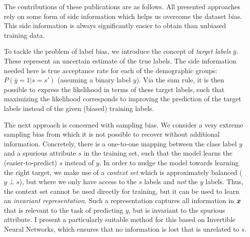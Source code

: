 The contributions of these publications are as follows.
All presented approaches rely on some form of side information which helps us overcome the dataset bias.
This side information is always significantly easier to obtain than unbiased training data.

To tackle the problem of label bias, we introduce the concept of \emph{target labels} $\bar{y}$.
These represent an uncertain estimate of the true labels.
The side information needed here is true acceptance rate for each of the demographic groups: $P(\bar{y}=1|s=s')$
(assuming a binary label $y$).
Via the sum rule, it is then possible to express the likelihood in terms of these target labels,
such that maximizing the likelihood corresponds to improving the prediction of the target labels
instead of the given (biased) training labels.

The next approach is concerned with sampling bias.
We consider a very extreme sampling bias from which it is not possible to recover without additional information.
Concretely, there is a one-to-one mapping between the class label $y$ and a spurious attribute $s$ in the training set,
such that the model learns the (easier-to-predict) $s$ instead of $y$.
In order to nudge the model towards learning the right target,
we make use of a \emph{context set} which is approximately balanced ($y\perp s$),
but where we only have access to the $s$ labels and \emph{not} the $y$ labels.
Thus, the context set cannot be used directly for training, but it can be used to learn an \emph{invariant representation}.
Such a representation captures all information in ${\bm{x}}$ that is relevant to the task of predicting $y$,
but is invariant to the spurious attribute.
I present a particularly suitable method for this based on Invertible Neural Networks,
which ensures that no information is lost that is unrelated to $s$.
